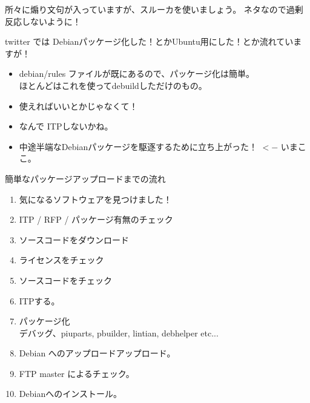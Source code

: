 \begin{frame}
所々に煽り文句が入っていますが、スルーカを使いましょう。
ネタなので過剰反応しないように！
\end{frame}

\begin{frame}
twitter では Debianパッケージ化した！とかUbuntu用にした！とか流れていま
 すが！
\end{frame}

\begin{frame}
\begin{itemize}
\item debian/rules ファイルが既にあるので、パッケージ化は簡単。\\
ほとんどはこれを使ってdebuildしただけのもの。
\item 使えればいいとかじゃなくて！
\item なんで ITPしないかね。
\item 中途半端なDebianパッケージを駆逐するために立ち上がった！ $<-$ いまこ
      こ。
\end{itemize}

\end{frame}


\begin{frame}{簡単なパッケージアップロードまでの流れ}
\begin{enumerate}
\item 気になるソフトウェアを見つけました！
\item ITP / RFP / パッケージ有無のチェック
\item ソースコードをダウンロード
\item ライセンスをチェック
\item ソースコードをチェック
\item ITPする。
\item パッケージ化 \\
デバッグ、piuparts, pbuilder, lintian, debhelper etc...

\item Debian へのアップロードアップロード。
\item FTP master によるチェック。
\item Debianへのインストール。
\end{enumerate}
\end{frame}

